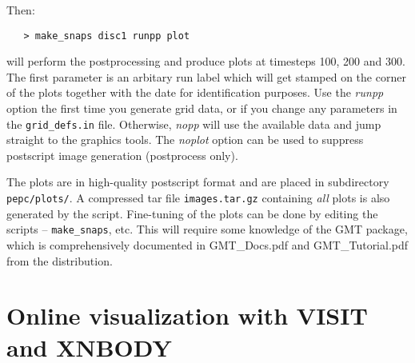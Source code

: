 \documentclass[11pt,psfig]{article}
\newcommand{\meno}{{\medskip\noindent}}
\begin{document}
\noindent
Then:

\begin{verbatim}
   > make_snaps disc1 runpp plot
\end{verbatim}

\noindent
will perform the postprocessing and produce plots at timesteps 100, 200
and 300.  The first parameter is an arbitary run label which will get stamped
on the corner of the plots together with the date for identification purposes.
Use the \textit{runpp} option the first time you generate grid data, or if you change
any parameters in the \texttt{grid_defs.in} file.  Otherwise, \textit{nopp} will use the available
data and jump straight to the graphics tools.  The \textit{noplot} option can be used to
suppress postscript image generation (postprocess only).

\meno
The plots are in high-quality postscript format and are placed in subdirectory 
\texttt{pepc/plots/}.
A compressed tar file \texttt{images.tar.gz} containing \textit{all} plots is also generated by the script.
Fine-tuning of the plots can be done by editing the scripts --
\texttt{make_snaps}, etc.  This will require some knowledge of the GMT package, which is
comprehensively documented in GMT_Docs.pdf and GMT_Tutorial.pdf from the distribution.

\section{Online visualization with VISIT and XNBODY}
\end{document}
